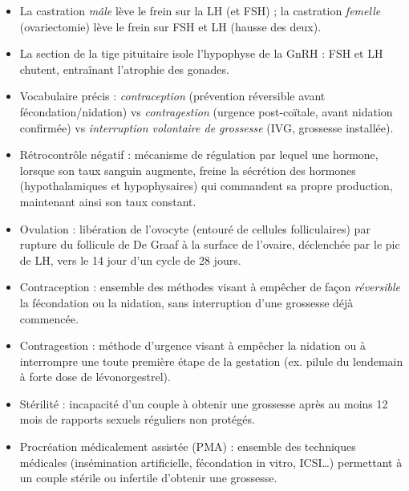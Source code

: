 \documentclass[11pt]{article}
\newcommand{\cle}[1]{{\popxbold\color{popdark}#1}}
\begin{document}
\begin{attention}
\begin{itemize}
\item La castration \emph{mâle} lève le frein sur la LH (et FSH) ; la castration \emph{femelle} (ovariectomie) lève le frein sur FSH et LH (hausse des deux).
\item La section de la tige pituitaire isole l'hypophyse de la GnRH : FSH et LH chutent, entraînant l'atrophie des gonades.
\item Vocabulaire précis : \emph{contraception} (prévention réversible avant fécondation/nidation) vs \emph{contragestion} (urgence post-coïtale, avant nidation confirmée) vs \emph{interruption volontaire de grossesse} (IVG, grossesse installée).
\end{itemize}
\end{attention}

\begin{corrige}
\begin{itemize}
\item \cle{Rétrocontrôle négatif} : mécanisme de régulation par lequel une hormone, lorsque son taux sanguin augmente, freine la sécrétion des hormones (hypothalamiques et hypophysaires) qui commandent sa propre production, maintenant ainsi son taux constant.
\item \cle{Ovulation} : libération de l'ovocyte (entouré de cellules folliculaires) par rupture du follicule de De Graaf à la surface de l'ovaire, déclenchée par le pic de LH, vers le 14\ieme{} jour d'un cycle de 28 jours.
\item \cle{Contraception} : ensemble des méthodes visant à empêcher de façon \emph{réversible} la fécondation ou la nidation, sans interruption d'une grossesse déjà commencée.
\item \cle{Contragestion} : méthode d'urgence visant à empêcher la nidation ou à interrompre une toute première étape de la gestation (ex. pilule du lendemain à forte dose de lévonorgestrel).
\item \cle{Stérilité} : incapacité d'un couple à obtenir une grossesse après au moins 12 mois de rapports sexuels réguliers non protégés.
\item \cle{Procréation médicalement assistée (PMA)} : ensemble des techniques médicales (insémination artificielle, fécondation in vitro, ICSI\ldots) permettant à un couple stérile ou infertile d'obtenir une grossesse.
\end{itemize}
\end{corrige}
\end{document}

